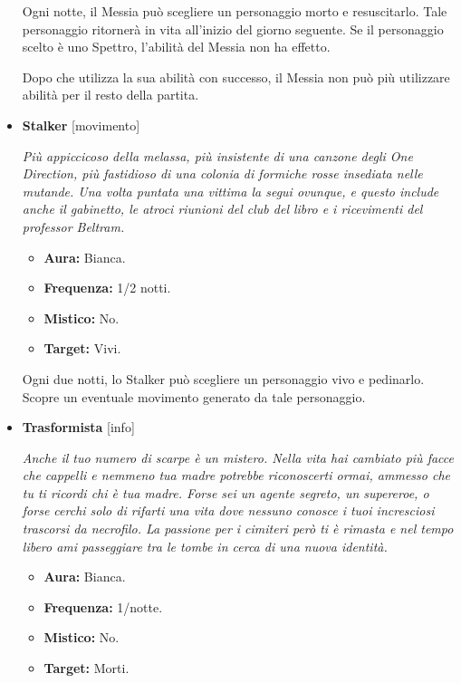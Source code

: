 \documentclass[a4paper,10pt]{article}
\begin{document}
\begin{itemize}
            Ogni notte, il Messia può scegliere un personaggio morto e resuscitarlo. Tale personaggio ritornerà in vita all'inizio del giorno seguente. Se il personaggio scelto è uno Spettro, l'abilità del Messia non ha effetto.

            Dopo che utilizza la sua abilità con successo, il Messia non può più utilizzare abilità per il resto della partita.

      \item \textbf{Stalker} [movimento]

            \emph{Più appiccicoso della melassa, più insistente di una canzone degli One Direction, più fastidioso di una colonia di formiche rosse insediata nelle mutande. Una volta puntata una vittima la segui ovunque, e questo include anche il gabinetto, le atroci riunioni del club del libro e i ricevimenti del professor Beltram.}

            \begin{multicols}{2}
                  \begin{itemize}
                        \item \textbf{Aura:} Bianca.
                        \item \textbf{Frequenza:} 1/2 notti.
                        \item \textbf{Mistico:} No.
                        \item \textbf{Target:} Vivi.
                  \end{itemize}
            \end{multicols}

            Ogni due notti, lo Stalker può scegliere un personaggio vivo e pedinarlo. Scopre un eventuale movimento generato da tale personaggio.


      \item \textbf{Trasformista} [info]

            \emph{Anche il tuo numero di scarpe è un mistero. Nella vita hai cambiato più facce che cappelli e nemmeno tua madre potrebbe riconoscerti ormai, ammesso che tu ti ricordi chi è tua madre. Forse sei un agente segreto, un supereroe, o forse cerchi solo di rifarti una vita dove nessuno conosce i tuoi incresciosi trascorsi da necrofilo. La passione per i cimiteri però ti è rimasta e nel tempo libero ami passeggiare tra le tombe in cerca di una nuova identità.}

            \begin{multicols}{2}
                  \begin{itemize}
                        \item \textbf{Aura:} Bianca.
                        \item \textbf{Frequenza:} 1/notte.
                        \item \textbf{Mistico:} No.
                        \item \textbf{Target:} Morti.
                  \end{itemize}
            \end{multicols}


\end{itemize}
\end{document}
